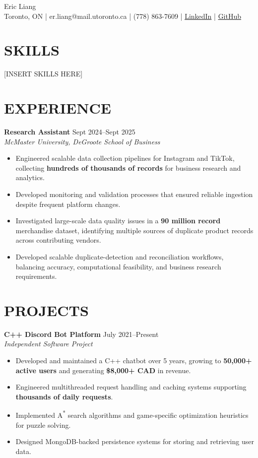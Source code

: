 \documentclass[10pt]{article}
\newenvironment{projectentry}[3]{%
    \noindent\textbf{#1} \hfill {\small #3}\\%
    \noindent\textit{#2}%
  \begin{itemize}
}{%
    \end{itemize}\par%
}
\begin{document}
\begin{center}
{\huge Eric Liang}\\
Toronto, ON | er.liang@mail.utoronto.ca | (778) 863-7609 | \href{https://www.linkedin.com/in/e1444/}{LinkedIn} | \href{https://github.com/e1444}{GitHub}
\end{center}

\section*{SKILLS}

[INSERT SKILLS HERE]

\section*{EXPERIENCE}

\begin{projectentry}{Research Assistant}{McMaster University, DeGroote School of Business}{Sept 2024--Sept 2025}
\item Engineered scalable data collection pipelines for Instagram and TikTok, collecting \textbf{hundreds of thousands of records} for business research and analytics.
\item Developed monitoring and validation processes that ensured reliable ingestion despite frequent platform changes. 
\item Investigated large-scale data quality issues in a \textbf{90 million record} merchandise dataset, identifying multiple sources of duplicate product records across contributing vendors.
\item Developed scalable duplicate-detection and reconciliation workflows, balancing accuracy, computational feasibility, and business research requirements.
\end{projectentry}

\section*{PROJECTS}

\begin{projectentry}{C++ Discord Bot Platform}{Independent Software Project}{July 2021--Present}
\item Developed and maintained a C++ chatbot over 5 years, growing to \textbf{50,000+ active users} and generating \textbf{\$8,000+ CAD} in revenue.
\item Engineered multithreaded request handling and caching systems supporting \textbf{thousands of daily requests}.
\item Implemented A\textsuperscript{*} search algorithms and game-specific optimization heuristics for puzzle solving.
\item Designed MongoDB-backed persistence systems for storing and retrieving user data.
\end{projectentry}
\end{document}
